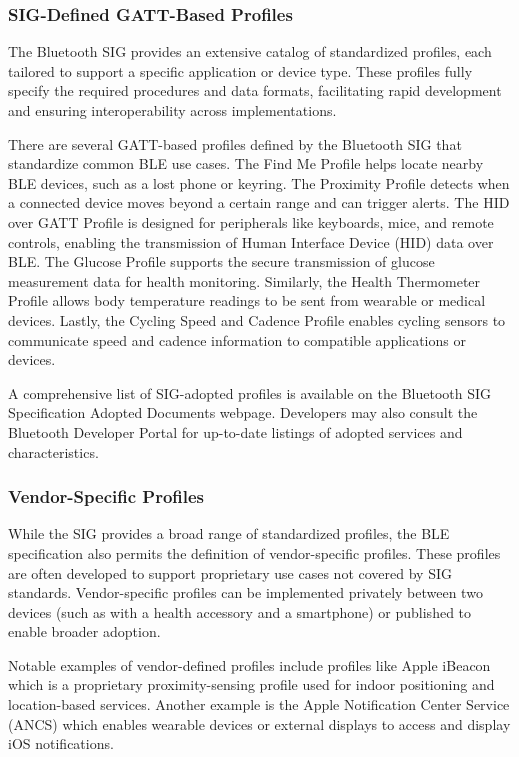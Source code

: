 \subsubsection{SIG-Defined GATT-Based Profiles}

The Bluetooth SIG provides an extensive catalog of standardized profiles, each tailored to support a specific application or device type. These profiles fully specify the required procedures and data formats, facilitating rapid development and ensuring interoperability across implementations.

There are several GATT-based profiles defined by the Bluetooth SIG that standardize common BLE use cases. The Find Me Profile helps locate nearby BLE devices, such as a lost phone or keyring. The Proximity Profile detects when a connected device moves beyond a certain range and can trigger alerts. The HID over GATT Profile is designed for peripherals like keyboards, mice, and remote controls, enabling the transmission of Human Interface Device (HID) data over BLE. The Glucose Profile supports the secure transmission of glucose measurement data for health monitoring. Similarly, the Health Thermometer Profile allows body temperature readings to be sent from wearable or medical devices. Lastly, the Cycling Speed and Cadence Profile enables cycling sensors to communicate speed and cadence information to compatible applications or devices.

A comprehensive list of SIG-adopted profiles is available on the Bluetooth SIG Specification Adopted Documents webpage. Developers may also consult the Bluetooth Developer Portal for up-to-date listings of adopted services and characteristics.

\subsubsection{Vendor-Specific Profiles}

While the SIG provides a broad range of standardized profiles, the BLE specification also permits the definition of vendor-specific profiles. These profiles are often developed to support proprietary use cases not covered by SIG standards. Vendor-specific profiles can be implemented privately between two devices (such as with a health accessory and a smartphone) or published to enable broader adoption.

Notable examples of vendor-defined profiles include profiles like Apple iBeacon which is a proprietary proximity-sensing profile used for indoor positioning and location-based services. Another example is the Apple Notification Center Service (ANCS) which enables wearable devices or external displays to access and display iOS notifications.

